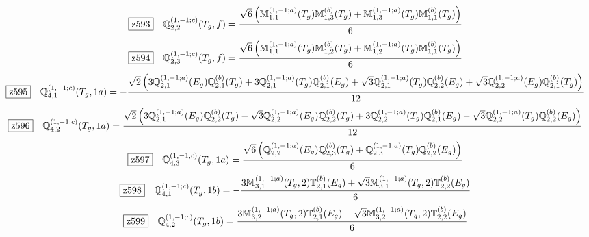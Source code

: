 \documentclass[fleqn,10pt,landscape]{jsarticle}
\begin{document}
\begin{dmath*}
\hspace*{3mm}\fbox{z593}\quad \mathbb{Q}_{2,2}^{(1,-1;c)}(T_{g},f)=\frac{\sqrt{6} \left(\mathbb{M}_{1,1}^{(1,-1;a)}(T_{g}) \mathbb{M}_{1,3}^{(b)}(T_{g}) + \mathbb{M}_{1,3}^{(1,-1;a)}(T_{g}) \mathbb{M}_{1,1}^{(b)}(T_{g})\right)}{6}
\end{dmath*}
\begin{dmath*}
\hspace*{3mm}\fbox{z594}\quad \mathbb{Q}_{2,3}^{(1,-1;c)}(T_{g},f)=\frac{\sqrt{6} \left(\mathbb{M}_{1,1}^{(1,-1;a)}(T_{g}) \mathbb{M}_{1,2}^{(b)}(T_{g}) + \mathbb{M}_{1,2}^{(1,-1;a)}(T_{g}) \mathbb{M}_{1,1}^{(b)}(T_{g})\right)}{6}
\end{dmath*}
\begin{dmath*}
\hspace*{3mm}\fbox{z595}\quad \mathbb{Q}_{4,1}^{(1,-1;c)}(T_{g},1a)=- \frac{\sqrt{2} \left(3 \mathbb{Q}_{2,1}^{(1,-1;a)}(E_{g}) \mathbb{Q}_{2,1}^{(b)}(T_{g}) + 3 \mathbb{Q}_{2,1}^{(1,-1;a)}(T_{g}) \mathbb{Q}_{2,1}^{(b)}(E_{g}) + \sqrt{3} \mathbb{Q}_{2,1}^{(1,-1;a)}(T_{g}) \mathbb{Q}_{2,2}^{(b)}(E_{g}) + \sqrt{3} \mathbb{Q}_{2,2}^{(1,-1;a)}(E_{g}) \mathbb{Q}_{2,1}^{(b)}(T_{g})\right)}{12}
\end{dmath*}
\begin{dmath*}
\hspace*{3mm}\fbox{z596}\quad \mathbb{Q}_{4,2}^{(1,-1;c)}(T_{g},1a)=\frac{\sqrt{2} \left(3 \mathbb{Q}_{2,1}^{(1,-1;a)}(E_{g}) \mathbb{Q}_{2,2}^{(b)}(T_{g}) - \sqrt{3} \mathbb{Q}_{2,2}^{(1,-1;a)}(E_{g}) \mathbb{Q}_{2,2}^{(b)}(T_{g}) + 3 \mathbb{Q}_{2,2}^{(1,-1;a)}(T_{g}) \mathbb{Q}_{2,1}^{(b)}(E_{g}) - \sqrt{3} \mathbb{Q}_{2,2}^{(1,-1;a)}(T_{g}) \mathbb{Q}_{2,2}^{(b)}(E_{g})\right)}{12}
\end{dmath*}
\begin{dmath*}
\hspace*{3mm}\fbox{z597}\quad \mathbb{Q}_{4,3}^{(1,-1;c)}(T_{g},1a)=\frac{\sqrt{6} \left(\mathbb{Q}_{2,2}^{(1,-1;a)}(E_{g}) \mathbb{Q}_{2,3}^{(b)}(T_{g}) + \mathbb{Q}_{2,3}^{(1,-1;a)}(T_{g}) \mathbb{Q}_{2,2}^{(b)}(E_{g})\right)}{6}
\end{dmath*}
\begin{dmath*}
\hspace*{3mm}\fbox{z598}\quad \mathbb{Q}_{4,1}^{(1,-1;c)}(T_{g},1b)=- \frac{3 \mathbb{M}_{3,1}^{(1,-1;a)}(T_{g},2) \mathbb{T}_{2,1}^{(b)}(E_{g}) + \sqrt{3} \mathbb{M}_{3,1}^{(1,-1;a)}(T_{g},2) \mathbb{T}_{2,2}^{(b)}(E_{g})}{6}
\end{dmath*}
\begin{dmath*}
\hspace*{3mm}\fbox{z599}\quad \mathbb{Q}_{4,2}^{(1,-1;c)}(T_{g},1b)=\frac{3 \mathbb{M}_{3,2}^{(1,-1;a)}(T_{g},2) \mathbb{T}_{2,1}^{(b)}(E_{g}) - \sqrt{3} \mathbb{M}_{3,2}^{(1,-1;a)}(T_{g},2) \mathbb{T}_{2,2}^{(b)}(E_{g})}{6}
\end{dmath*}
\end{document}
